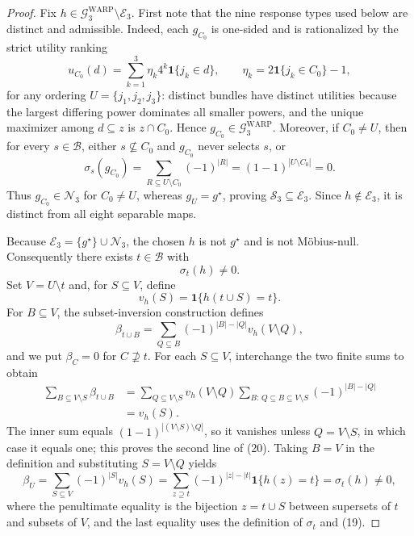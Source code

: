 \documentclass{article}
\begin{document}
\begin{proof}
Fix \(h\in\mathcal G^{\mathrm{WARP}}_3\setminus\mathcal E_3\).  First note that the nine response types used below are distinct and admissible.  Indeed, each \(g_{C_0}\) is one-sided and is rationalized by the strict utility ranking
\[
u_{C_0}(d)=\sum_{k=1}^3\eta_k4^k\mathbf 1\{j_k\in d\},
\qquad
\eta_k=2\mathbf 1\{j_k\in C_0\}-1,
\]
for any ordering \(U=\{j_1,j_2,j_3\}\): distinct bundles have distinct utilities because the largest differing power dominates all smaller powers, and the unique maximizer among \(d\subseteq z\) is \(z\cap C_0\).  Hence \(g_{C_0}\in\mathcal G^{\mathrm{WARP}}_3\).  Moreover, if \(C_0\ne U\), then for every \(s\in\mathcal B\), either \(s\not\subseteq C_0\) and \(g_{C_0}\) never selects \(s\), or
\[
\sigma_s(g_{C_0})
=\sum_{R\subseteq U\setminus C_0}(-1)^{|R|}
=(1-1)^{|U\setminus C_0|}=0.
\]
Thus \(g_{C_0}\in\mathcal N_3\) for \(C_0\ne U\), whereas \(g_U=g^\star\), proving \(\mathcal S_3\subseteq\mathcal E_3\).  Since \(h\notin\mathcal E_3\), it is distinct from all eight separable maps.

Because \(\mathcal E_3=\{g^\star\}\cup\mathcal N_3\), the chosen \(h\) is not \(g^\star\) and is not Möbius-null.  Consequently there exists \(t\in\mathcal B\) with
\[
\sigma_t(h)\ne0. \tag{19}
\]
Set \(V=U\setminus t\) and, for \(S\subseteq V\), define
\[
v_h(S)=\mathbf 1\{h(t\cup S)=t\}.
\]
For \(B\subseteq V\), the subset-inversion construction defines
\[
\beta_{t\cup B}
=\sum_{Q\subseteq B}(-1)^{|B|-|Q|}v_h(V\setminus Q),
\]
and we put \(\beta_C=0\) for \(C\not\supseteq t\).  For each \(S\subseteq V\), interchange the two finite sums to obtain
\[
\begin{aligned}
\sum_{B\subseteq V\setminus S}\beta_{t\cup B}
&=\sum_{Q\subseteq V\setminus S}v_h(V\setminus Q)
  \sum_{B:\,Q\subseteq B\subseteq V\setminus S}(-1)^{|B|-|Q|}\\
&=v_h(S). \tag{20}
\end{aligned}
\]
The inner sum equals \((1-1)^{|(V\setminus S)\setminus Q|}\), so it vanishes unless \(Q=V\setminus S\), in which case it equals one; this proves the second line of (20).  Taking \(B=V\) in the definition and substituting \(S=V\setminus Q\) yields
\[
\beta_U
=\sum_{S\subseteq V}(-1)^{|S|}v_h(S)
=\sum_{z\supseteq t}(-1)^{|z|-|t|}\mathbf 1\{h(z)=t\}
=\sigma_t(h)\ne0, \tag{21}
\]
where the penultimate equality is the bijection \(z=t\cup S\) between supersets of \(t\) and subsets of \(V\), and the last equality uses the definition of \(\sigma_t\) and (19).


\end{proof}
\end{document}
